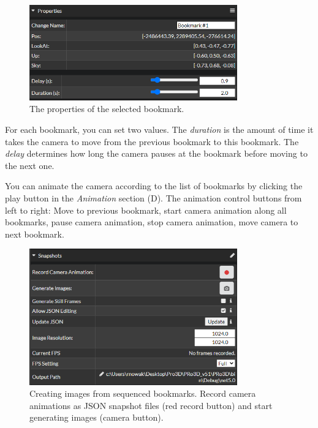 \begin{figure}[h]
	\centering
	\includegraphics[width=0.8\textwidth]{pics/SequencedBookmarks_properties.png}
	\caption[Viewer Features Bookmarks]{The properties of the selected bookmark.}
	\label{fig:seqBookmarks_properties}
\end{figure}

For each bookmark, you can set two values. The \emph{duration} is the amount of time it takes the camera to move from the previous bookmark to this bookmark. The \emph{delay} determines how long the camera pauses at the bookmark before moving to the next one.

You can animate the camera according to the list of bookmarks by clicking the play button in the \emph{Animation} section (D). The animation control buttons from left to right: Move to previous bookmark, start camera animation along all bookmarks, pause camera animation, stop camera animation, move camera to next bookmark.



\begin{figure}[h]
	\centering
	\includegraphics[width=0.8\textwidth]{pics/SequencedBookmarks_snapshots.png}
	\caption[Viewer Features Bookmarks]{Creating images from sequenced bookmarks. Record camera animations as JSON snapshot files (red record button) and start generating images (camera button).}
	\label{fig:seqBookmarks_snapshots}
\end{figure}

